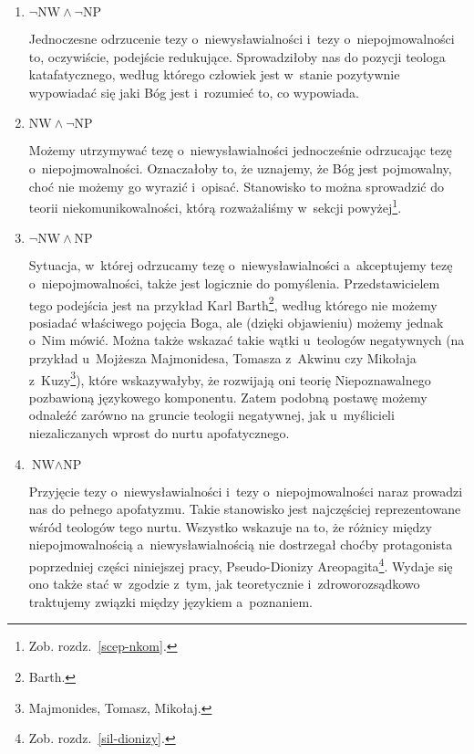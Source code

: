 \begin{enumerate}[label = \arabic*)]
\item $\neg \text{NW} \land \neg \text{NP}$

Jednoczesne odrzucenie tezy o~niewysławialności i~tezy o~niepojmowalności to, oczywiście, podejście redukujące. Sprowadziłoby nas do pozycji teologa katafatycznego, według którego człowiek jest w~stanie pozytywnie wypowiadać się jaki Bóg jest i~rozumieć to, co wypowiada.

\item $\text{NW} \land \neg \text{NP}$

Możemy utrzymywać tezę o~niewysławialności jednocześnie odrzucając tezę o~niepojmowalności. Oznaczałoby to, że uznajemy, że Bóg jest pojmowalny, choć nie możemy go wyrazić i~opisać. Stanowisko to można sprowadzić do teorii niekomunikowalności, którą rozważaliśmy w~sekcji powyżej\footnote{Zob. rozdz.~\ref{scep-nkom}.}.

\item $\neg \text{NW} \land \text{NP}$

Sytuacja, w~której odrzucamy tezę o~niewysławialności a~akceptujemy tezę o~niepojmowalności, także jest logicznie do pomyślenia. Przedstawicielem tego podejścia jest na przykład Karl Barth\footnote{Barth.}, według którego nie możemy posiadać właściwego pojęcia Boga, ale (dzięki objawieniu) możemy jednak o~Nim mówić. Można także wskazać takie wątki u~teologów negatywnych (na przykład u~Mojżesza Majmonidesa, Tomasza z~Akwinu czy Mikołaja z~Kuzy\footnote{Majmonides, Tomasz, Mikołaj.}), które wskazywałyby, że rozwijają oni teorię Niepoznawalnego pozbawioną językowego komponentu. Zatem podobną postawę możemy odnaleźć zarówno na gruncie teologii negatywnej, jak u~myślicieli niezaliczanych wprost do nurtu apofatycznego.

\item $\text{NW} \land \text{NP}$

Przyjęcie tezy o~niewysławialności i~tezy o~niepojmowalności naraz prowadzi nas do pełnego apofatyzmu. Takie stanowisko jest najczęściej reprezentowane wśród teologów tego nurtu. Wszystko wskazuje na to, że różnicy między niepojmowalnością a~niewysławialnością nie dostrzegał choćby protagonista poprzedniej części niniejszej pracy, Pseudo-Dionizy Areopagita\footnote{Zob. rozdz.~\ref{sil-dionizy}.}. Wydaje się ono także stać w~zgodzie z~tym, jak teoretycznie i~zdroworozsądkowo traktujemy związki między językiem a~poznaniem.
\end{enumerate}

